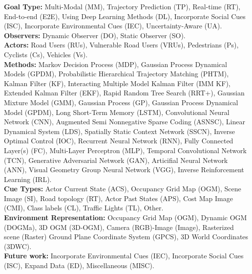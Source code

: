 \begin{table}[h!]
{		\textbf{Goal Type:} 
		Multi-Modal (MM),
		Trajectory Prediction (TP),
		Real-time (RT),
		End-to-end (E2E),
		Using Deep Learning Methods (DL),
		Incorporate Social Cues (ISC),
		Incorporate Environmental Cues (IEC),
		Uncertainty-Aware (UA). \\\hspace{\textwidth} 
		\textbf{Observers:}
		Dynamic Observer (DO),
		Static Observer (SO). \\\hspace{\textwidth} 
		\textbf{Actors:}
		Road Users (RUs),
		Vulnerable Road Users (VRUs),
		Pedestrians (Ps),
		Cyclists (Cs),
		Vehicles (Vs). \\\hspace{\textwidth} 
		\textbf{Methods:} 
		Markov Decision Process (MDP),
		Gaussian Process Dynamical Models (GPDM),
		Probabilistic Hierarchical Trajectory Matching  (PHTM),
		Kalman Filter (KF),
		Interacting Multiple Model Kalman Filter (IMM KF),
		Extended Kalman Filter (EKF),
		Rapid Random Tree Search (RRT+),
		Gaussian Mixture Model (GMM),
		Gaussian Process (GP),
		Gaussian Process Dynamical Model (GPDM),
		Long Short-Term Memory (LSTM),
		Convolutional Neural Network (CNN),
		Augmented Semi Nonnegative Sparse Coding (ASNSC),
		Linear Dynamical System (LDS),
		Spatially Static Context Network (SSCN),
		Inverse Optimal Control (IOC),
		Recurrent Neural Network (RNN),
		Fully Connected Layer(s) (FC),
		Multi-Layer Perceptron (MLP),
		Temporal Convolutional Network (TCN),
		Generative Adversarial Network (GAN),
		Articifial Neural Network (ANN),
		Visual Geometry Group Neural Network (VGG),
		Inverse Reinforcement Learning (IRL). \\\hspace{\textwidth} 
		\textbf{Cue Types:}
		Actor Current State (ACS),
		Occupancy Grid Map (OGM),
		Scene Image (SI),
		Road topology (RT),
		Actor Past States (APS),
		Cost Map Image (CMI),
		Class labels (CL),
		Traffic Lights (TL),
		Other. \\\hspace{\textwidth} 
		\textbf{Environment Representation:}
		Occupancy Grid Map (OGM),
		Dynamic OGM (DOGMa),
		3D OGM (3D-OGM),
		Camera (RGB)-Image (Image),
		Rasterized scene (Raster)
		Ground Plane Coordinate System (GPCS),
		3D World Coordinates (3DWC). \\\hspace{\textwidth} 
		\textbf{Future work:}
		Incorporate Environmental Cues (IEC),
		Incorporate Social Cues (ISC),
		Expand Data (ED),
		Miscellaneous (MISC).}
	\label{tab:overview_mot_pred}
\end{table}